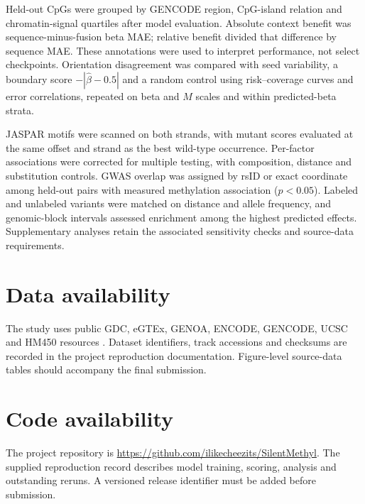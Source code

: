 \documentclass[11pt,letterpaper,twocolumn]{article}
\begin{document}
Held-out CpGs were grouped by GENCODE region, CpG-island relation and chromatin-signal quartiles after model evaluation. Absolute context benefit was sequence-minus-fusion beta MAE; relative benefit divided that difference by sequence MAE. These annotations were used to interpret performance, not select checkpoints. Orientation disagreement was compared with seed variability, a boundary score $-|\widehat\beta-0.5|$ and a random control using risk--coverage curves and error correlations, repeated on beta and $M$ scales and within predicted-beta strata.

JASPAR motifs were scanned on both strands, with mutant scores evaluated at the same offset and strand as the best wild-type occurrence. Per-factor associations were corrected for multiple testing, with composition, distance and substitution controls. GWAS overlap was assigned by rsID or exact coordinate among held-out pairs with measured methylation association ($p<0.05$). Labeled and unlabeled variants were matched on distance and allele frequency, and genomic-block intervals assessed enrichment among the highest predicted effects. Supplementary analyses retain the associated sensitivity checks and source-data requirements.

\section*{Data availability}
The study uses public GDC, eGTEx, GENOA, ENCODE, GENCODE, UCSC and HM450 resources \cite{grossman2016gdc,oliva2023mqtl,shang2023genoa,encode2012integrated,frankish2021gencode,kent2002ucsc,zhou2017infinium}. Dataset identifiers, track accessions and checksums are recorded in the project reproduction documentation. Figure-level source-data tables should accompany the final submission.

\section*{Code availability}
The project repository is \url{https://github.com/ilikecheezits/SilentMethyl}. The supplied reproduction record describes model training, scoring, analysis and outstanding reruns. A versioned release identifier must be added before submission.
\end{document}
